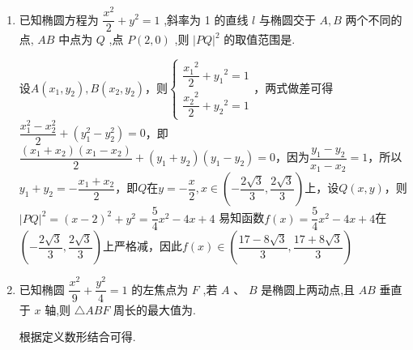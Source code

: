 \begin{enumerate}
\begin{jieda}
\begin{enumerate}
            设$f(x) = \dfrac{5}{9}\left(x - \dfrac{9a}{5}\right)^2+4-\dfrac{4a^{2}}{5}, x \in [-3, 3]$
            
        \end{enumerate}
    \end{jieda}
    \item 已知椭圆方程为 $\dfrac{{x}^{2}}{2} + {y}^{2} = 1$ ,斜率为 1 的直线 $l$ 与椭圆交于 $A,B$ 两个不同的点, ${AB}$ 中点为 $Q$ ,点 $P\left( {2,0}\right)$ ,则 ${\left| PQ\right| }^{2}$ 的取值范围是.
    \begin{jieda}
        设$A(x_1, y_2), B(x_2, y_2)$，则$\left\{\begin{array}{l}
             \dfrac{{x_1}^{2}}{2} + {y_1}^{2} = 1 \\
             \dfrac{{x_2}^{2}}{2} + {y_2}^{2} = 1 
        \end{array}\right.$，两式做差可得$\dfrac{x_1^2-x_2^2}{2} + (y_1^2-y_2^2) = 0$，即$\dfrac{(x_1+x_2)(x_1-x_2)}{2} + (y_1+y_2)(y_1-y_2) = 0$，因为$\dfrac{y_1-y_2}{x_1-x_2} = 1$，所以$y_1+y_2 = -\dfrac{x_1+x_2}{2}$，即$Q$在$y = -\dfrac{x}{2}, x \in \left(-\dfrac{2\sqrt{3}}{3}, \dfrac{2\sqrt{3}}{3}\right)$上，设$Q(x, y)$，则$|PQ|^2 = (x-2)^2+y^2 = \dfrac{5}{4}x^2-4x+4$
        易知函数$f(x) = \dfrac{5}{4}x^2-4x+4$在$\left(-\dfrac{2\sqrt{3}}{3}, \dfrac{2\sqrt{3}}{3}\right)$上严格减，因此$f(x) \in \left(\dfrac{17-8\sqrt{3}}{3}, \dfrac{17+8\sqrt{3}}{3}\right)$
    \end{jieda}
    \item 已知椭圆 $\dfrac{{x}^{2}}{9} + \dfrac{{y}^{2}}{4} = 1$ 的左焦点为 $F$ ,若 $A$ 、 $B$ 是椭圆上两动点,且 ${AB}$ 垂直于 $x$ 轴,则 $\bigtriangleup  {ABF}$ 周长的最大值为.
    \begin{jieda}
        根据定义数形结合可得.  
    \end{jieda}

\end{enumerate}

